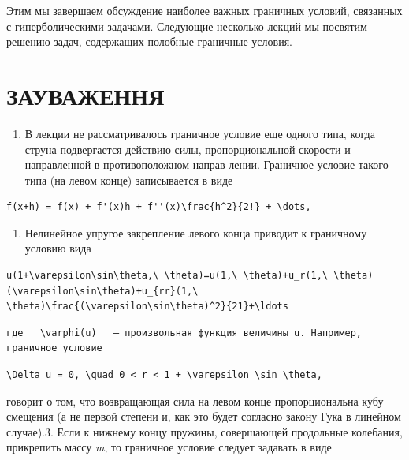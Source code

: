 \documentclass[
  ukrainian,
]{article}
\providecommand{\tightlist}{%
  \setlength{\itemsep}{0pt}\setlength{\parskip}{0pt}}
\begin{document}
Этим мы завершаем обсуждение наиболее важных граничных условий,
связанных с гиперболическими задачами. Следующие несколько лекций мы
посвятим решению задач, содержащих полобные граничные условия.

\section{ЗАУВАЖЕННЯ}\label{ux437ux430ux443ux432ux430ux436ux435ux43dux43dux44f-2}

\begin{enumerate}
\def\labelenumi{\arabic{enumi}.}
\tightlist
\item
  В лекции не рассматривалось граничное условие еще одного типа, когда
  струна подвергается действию силы, пропорциональной скорости и
  направленной в противоположном направ-лении. Граничное условие такого
  типа (на левом конце) записывается в виде
\end{enumerate}

\begin{verbatim}
f(x+h) = f(x) + f'(x)h + f''(x)\frac{h^2}{2!} + \dots,
\end{verbatim}

\begin{enumerate}
\def\labelenumi{\arabic{enumi}.}
\setcounter{enumi}{1}
\tightlist
\item
  Нелинейное упругое закрепление левого конца приводит к граничному
  условию вида
\end{enumerate}

\begin{verbatim}
u(1+\varepsilon\sin\theta,\ \theta)=u(1,\ \theta)+u_r(1,\ \theta)(\varepsilon\sin\theta)+u_{rr}(1,\ \theta)\frac{(\varepsilon\sin\theta)^2}{21}+\ldots
\end{verbatim}

\begin{verbatim}
где   \varphi(u)   — произвольная функция величины u. Например, граничное условие
\end{verbatim}

\begin{verbatim}
\Delta u = 0, \quad 0 < r < 1 + \varepsilon \sin \theta,
\end{verbatim}

говорит о том, что возвращающая сила на левом конце пропорциональна кубу
смещения (а не первой степени и, как это будет согласно закону Гука в
линейном случае).3. Если к нижнему концу пружины, совершающей продольные
колебания, прикрепить массу \emph{m}, то граничное условие следует
задавать в виде
\end{document}
